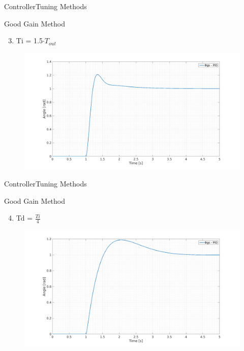 \begin{frame}{Controller}{Tuning Methods}
  \begin{block}{Good Gain Method}
  
	  \begin{enumerate}
	  \setcounter{enumi}{2}
	  	\item Ti = 1.5$\cdot T_{out}$
	  \end{enumerate}
	  \begin{figure}
       \includegraphics[scale=0.20]{../report/figures/GG3.png}
      \end{figure}
  
  \end{block}
\end{frame}



\begin{frame}{Controller}{Tuning Methods}
  \begin{block}{Good Gain Method}
  
	  \begin{enumerate}
	  \setcounter{enumi}{3}
	  	\item Td = $\frac{Ti}{4}$
	  \end{enumerate}
	  \begin{figure}
       \includegraphics[scale=0.20]{../report/figures/GG4.png}
      \end{figure}
  
  \end{block}
\end{frame}


